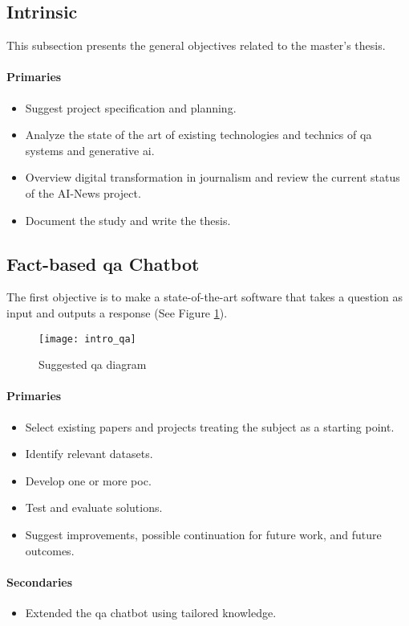\subsection*{Intrinsic}
This subsection presents the general objectives related to the master's thesis.
\paragraph{Primaries}
\begin{itemize}[noitemsep]
    \item Suggest project specification and planning.
    \item Analyze the state of the art of existing technologies and technics of \gls{qa} systems and generative \gls{ai}.
    \item Overview digital transformation in journalism and review the current status of the AI-News project.
    \item Document the study and write the thesis.
\end{itemize}

\subsection*{Fact-based \gls{qa} Chatbot}
The first objective is to make a state-of-the-art software that takes a question as input and outputs a response (See Figure \ref{fig:spec_qa}).
\begin{figure}[ht!]
    \centering
    \texttt{[image: intro\_qa]}
    \caption{Suggested \gls{qa} diagram}
    \label{fig:spec_qa}
\end{figure}

\paragraph{Primaries}
\begin{itemize}[noitemsep]
    \item Select existing papers and projects treating the subject as a starting point.
    \item Identify relevant datasets.
    \item Develop one or more \gls{poc}.
    \item Test and evaluate solutions.
    \item Suggest improvements, possible continuation for future work, and future outcomes.
\end{itemize}
\paragraph{Secondaries}
\begin{itemize}[noitemsep]
    \item Extended the \gls{qa} chatbot using tailored knowledge.
\end{itemize}

